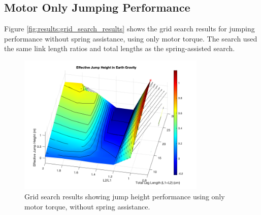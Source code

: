 \subsection{Motor Only Jumping Performance}
Figure \ref{fig:results:grid_search_results} shows the grid search results for jumping performance without spring assistance, using only motor torque. The search used the same link length ratios and total lengths as the spring-assisted search.

\begin{figure}[h]
    \centering
    \includegraphics[width=0.8\textwidth]{Images/results/grid_search_results.png}
    \caption{Grid search results showing jump height performance using only motor torque, without spring assistance.}
    \label{fig:results:motor_only_grid_search}
\end{figure}
